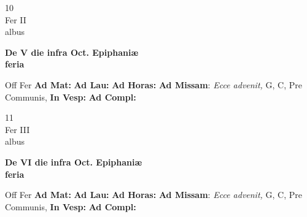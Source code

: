 \documentclass[10pt, openany]{book}
\begin{document}
        \begin{center}
            \begin{minipage}{3.5in}
                \vspace{2em}
                \begin{minipage}{0.5in}
                    {\Huge 10} \\
                    {\normalsize Fer II} \\
                    {\normalsize albus}
                \end{minipage}
                \begin{minipage}{3.0in}
                    \textbf{ \large De V die infra Oct. Epiphaniæ \\
                    \textnormal{\normalsize feria}} \\ 
                \end{minipage}
                \begin{justify}Off Fer
                    \textbf{Ad Mat: }
                    \textbf{Ad Lau: }
                    \textbf{Ad Horas: }\textbf{Ad Missam}: \textit{Ecce advenit,} G, C, Pre Communis,  
                    \textbf{In Vesp: }
                    \textbf{Ad Compl: }
                \end{justify}
            \end{minipage}
        \end{center}
    
        \begin{center}
            \begin{minipage}{3.5in}
                \vspace{2em}
                \begin{minipage}{0.5in}
                    {\Huge 11} \\
                    {\normalsize Fer III} \\
                    {\normalsize albus}
                \end{minipage}
                \begin{minipage}{3.0in}
                    \textbf{ \large De VI die infra Oct. Epiphaniæ \\
                    \textnormal{\normalsize feria}} \\ 
                \end{minipage}
                \begin{justify}Off Fer
                    \textbf{Ad Mat: }
                    \textbf{Ad Lau: }
                    \textbf{Ad Horas: }\textbf{Ad Missam}: \textit{Ecce advenit,} G, C, Pre Communis,  
                    \textbf{In Vesp: }
                    \textbf{Ad Compl: }
                \end{justify}
            \end{minipage}
        \end{center}
    
\end{document}
